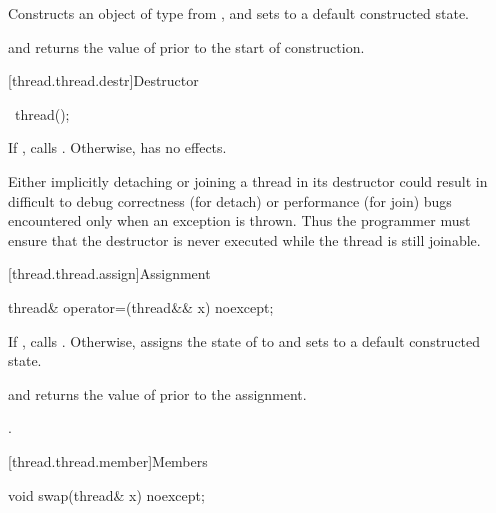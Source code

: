 \begin{itemdescr}
\pnum
\effects
Constructs an object of type  from , and sets
 to a default constructed state.

\pnum
\ensures
{} and  returns the
value of  prior to the start of construction.

\end{itemdescr}

[thread.thread.destr]{Destructor}

%
\begin{itemdecl}
~thread();
\end{itemdecl}

\begin{itemdescr}
\pnum
If , calls . Otherwise, has no effects.
\begin{note}
Either implicitly detaching or joining a  thread in its
destructor could result in difficult to debug correctness (for detach) or performance
(for join) bugs encountered only when an exception is thrown. Thus the programmer must
ensure that the destructor is never executed while the thread is still joinable.
\end{note}
\end{itemdescr}

[thread.thread.assign]{Assignment}

%
\begin{itemdecl}
thread& operator=(thread&& x) noexcept;
\end{itemdecl}

\begin{itemdescr}
\pnum
\effects
If , calls . Otherwise, assigns the
state of  to  and sets  to a default constructed state.

\pnum
\ensures
{} and  returns the value of
 prior to the assignment.

\pnum
\returns
{}.
\end{itemdescr}

[thread.thread.member]{Members}

%
\begin{itemdecl}
void swap(thread& x) noexcept;
\end{itemdecl}

